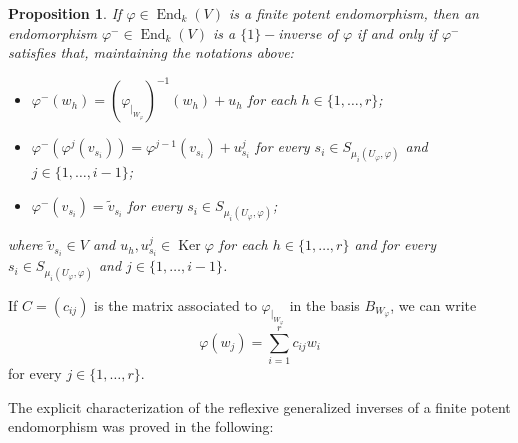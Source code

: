 \documentclass[10pt,a4paper]{amsart}
\newtheorem{prop}[defn]{Proposition}
\theoremstyle{plain}
\theoremstyle{remark}
\numberwithin{equation}{section} \numberwithin{defn}{section}
\newcommand\ed{\operatorname{End}}
\newcommand\Ker{\operatorname{Ker}}
\newcommand{\f}{\varphi}
\begin{document}
\begin{prop}\cite[Proposition 3.3]{PaAl}\label{P: 1invfp}
If $\f \in \ed_k(V)$ is a finite potent endomorphism, then an endomorphism $\f^{-}\in \ed_k(V)$ is a $\{1\}-$inverse of $\f$ if and only if $\f^{-}$ satisfies that, maintaining the notations above: \begin{itemize}

\item $\f^{-} (w_h) = (\f_{\vert_{W_\f}})^{-1} (w_h) + u_h$ for each $h\in \{1, \dots, r\}$;

\item $\f^{-} (\f^j ({{ v_{s_i}}})) = \f^{j-1} ({{ v_{s_i}}}) + u_{s_i}^j$ for every $s_i \in S_{{\mu}_i (U_{\f}, \f)}$ and $j\in \{1, \dots, i-1\}$;

\item $\f^{-} ({{ v_{s_i}}}) = {\tilde v}_{s_i}$ for every $ s_i \in S_{{\mu}_i (U_{\f}, \f)}$; \noindent
\end{itemize}
where ${\tilde v}_{s_i} \in V$ and $u_h,  u_{s_i}^j \in \Ker \f$ for each $h\in \{1, \dots, r\}$ and for every $s_i \in S_{{\mu}_i (U_{\f}, \f)}$ and $j\in \{1, \dots, i-1\}$.
\end{prop}



If $C = (c_{ij})$ is the matrix associated to $\varphi_{\vert_{W_\varphi}}$ in the basis $B_{W_\varphi}$, we can write $$\varphi (w_j) = \sum_{i=1}^r c_{ij} w_i$$\noindent for every $j\in \{1, \dots, r\}$.

The explicit characterization of the reflexive generalized inverses of a finite potent endomorphism was proved in the following:
\end{document}
